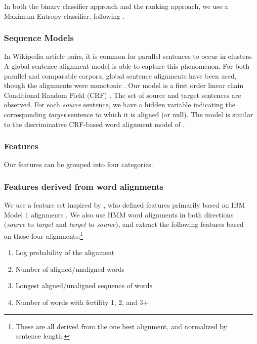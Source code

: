 \documentclass[11pt,letterpaper]{article}
\begin{document}
In both the binary classifier approach and the ranking approach, we use a Maximum Entropy
classifier, following .

\subsubsection{Sequence Models}
In Wikipedia article pairs, it is common for parallel sentences to
occur in clusters.  A global sentence alignment model is
able to capture this phenomenon. For both parallel and comparable
corpora, global sentence alignments have been used, though the
alignments were monotonic
\cite{Gale93,Moore02,Zhao02}.
Our model is a first order linear chain Conditional Random Field
(CRF) \cite{Lafferty01}. The set of source and
target sentences are observed. For each {\em source} sentence, we
have a hidden variable indicating the corresponding {\em target}
sentence to which it is aligned (or null). The model is similar to the
discriminative CRF-based word alignment model of
\cite{Blunsom06}.

\subsubsection{Features}
\label{sec:features}
Our features can be grouped into four categories.

\subsubsection*{Features derived from word alignments}

We use a feature set inspired by \cite{Munteanu05}, who defined
features primarily based on IBM Model 1 alignments
\cite{Brown93}.  We also use HMM word alignments
\cite{Vogel96} in both directions ({\em source} to {\em target} and
{\em target} to {\em source}), and extract the following features based on these
four alignments:\footnote{These are all derived from the one best alignment, and
normalized by sentence length.}

\begin{enumerate}
\item Log probability of the alignment
\item Number of aligned/unaligned words
\item Longest aligned/unaligned sequence of words
\item Number of words with fertility 1, 2, and 3+
\end{enumerate}
\end{document}
